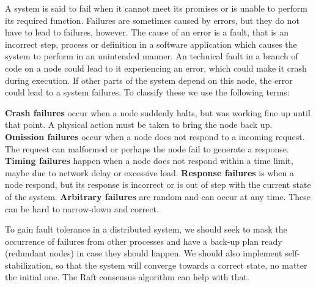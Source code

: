 \noindent A system is said to fail when it cannot meet its promises or is unable to perform its required function. Failures are sometimes caused by errors, but they do not have to lead to failures, however. The cause of an error is a fault, that is an incorrect step, process or definition in a software application which causes the system to perform in an unintended manner. An technical fault in a branch of code on a node could lead to it experiencing an error, which could make it crash during execution. If other parts of the system depend on this node, the error could lead to a system failures. To classify these we use the following terms:

\noindent \textbf{Crash failures} occur when a node suddenly halts, but was working fine up until that point. A physical action must be taken to bring the node back up. \textbf{Omission failures} occur when a node does not respond to a incoming request. The request can malformed or perhaps the node fail to generate a response. \textbf{Timing failures} happen when a node does not respond within a time limit, maybe due to network delay or excessive load. \textbf{Response failures} is when a node respond, but its response is incorrect or is out of step with the current state of the system. \textbf{Arbitrary failures} are random and can occur at any time. These can be hard to narrow-down and correct.

\noindent To gain fault tolerance in a distributed system, we should seek to mask the occurrence of failures from other processes and have a back-up plan ready (redundant nodes) in case they should happen. We should also implement self-stabilization, so that the system will converge towards a correct state, no matter the initial one. The Raft consensus algorithm can help with that.